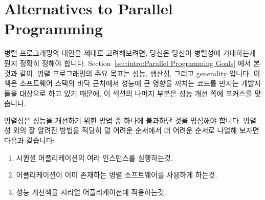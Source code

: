 \section{Alternatives to Parallel Programming}
\label{sec:intro:Alternatives to Parallel Programming}

병렬 프로그래밍의 대안을 제대로 고려해보려면, 당신은 당신이 병렬성에 기대하는게
뭔지 정확히 정해야 합니다.
Section~\ref{sec:intro:Parallel Programming Goals} 에서 본것과 같이, 병렬
프로그래밍의 주요 목표는 성능, 생산성, 그리고 generality 입니다.
이 책은 소프트웨어 스택의 바닥 근처에서 성능에 큰 영향을 끼치는 코드를 만지는
개발자들을 대상으로 하고 있기 때문에, 이 섹션의 나머지 부분은 성능 개선 쪽에
포커스를 맞춥니다.

병렬성은 성능을 개선하기 위한 방법 중 하나에 불과하단 것을 명심해야 합니다.
병렬성 외의 잘 알려진 방법을 적당히 덜 어려운 순서에서 더 어려운 순서로 나열해
보자면 다음과 같습니다:

\begin{enumerate}
\item	시퀀셜 어플리케이션의 여러 인스턴스를 실행하는것.
\item	어플리케이션이 이미 존재하는 병렬 소프트웨어를 사용하게 하는것.
\item	성능 개선책을 시리얼 어플리케이션에 적용하는것.

\end{enumerate}

